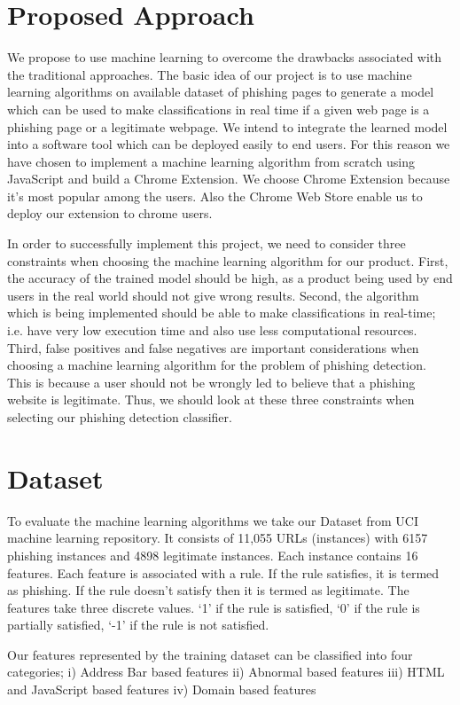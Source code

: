 \documentclass[conference]{IEEEtran}
\begin{document}
\section{Proposed Approach}
We propose to use machine learning to overcome the
drawbacks associated with the traditional approaches. The basic idea of our project is to use machine learning algorithms on available dataset of phishing
pages to generate a model which can be used to make
classifications in real time if a given web page is a phishing
page or a legitimate webpage. We intend to integrate the
learned model into a software tool which can be deployed
easily to end users. For this reason we have chosen to implement a machine learning
algorithm from scratch using JavaScript and build a Chrome Extension. We choose Chrome Extension because it's most popular among the users. Also the Chrome Web Store enable us to deploy our extension to chrome users.
\par In order to successfully implement this project, we need to
consider three constraints when choosing the machine learning
algorithm for our product. First, the accuracy of the trained
model should be high, as a product being used by end users
in the real world should not give wrong results. Second,
the algorithm which is being implemented should be able to
make classifications in real-time; i.e. have very low execution
time and also use less computational resources. Third, false
positives and false negatives are important considerations when
choosing a machine learning algorithm for the problem of
phishing detection. This is because a user should not be
wrongly led to believe that a phishing website is legitimate.
Thus, we should look at these three constraints when selecting
our phishing detection classifier.
\section{Dataset}
To evaluate the machine learning algorithms we take our Dataset from UCI machine learning repository. It consists of 11,055 URLs (instances)
with 6157 phishing instances and 4898 legitimate instances.
Each instance contains 16 features. Each feature is associated
with a rule. If the rule satisfies, it is termed as phishing. If
the rule doesn’t satisfy then it is termed as legitimate. The
features take three discrete values. ‘1’ if the rule is satisfied,
‘0’ if the rule is partially satisfied, ‘-1’ if the rule is not
satisfied.
\par Our features represented by the training dataset can be
classified into four categories;
i) Address Bar based features
ii) Abnormal based features
iii) HTML and JavaScript based features
iv) Domain based features
\end{document}
